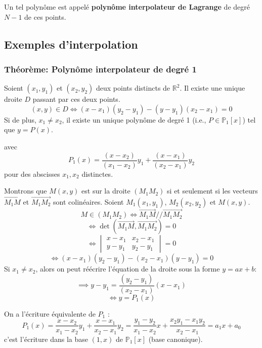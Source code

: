 \documentclass[oneside]{book}
\begin{document}
\begin{definition}
Un tel polynôme est appelé \textbf{polynôme interpolateur de Lagrange} de degré $N-1$ de ces points.
\end{definition}

\subsection{Exemples d'interpolation}

\subsubsection{Théorème: Polynôme interpolateur de degré 1}

\begin{theorem}
Soient $(x_1, y_1)$ et $(x_2, y_2)$ deux points distincts de $\mathbb{R}^2$.
Il existe une unique droite $D$ passant par ces deux points.
\[
(x, y) \in D \iff (x-x_1)(y_2-y_1) - (y-y_1)(x_2-x_1) = 0
\]
Si de plus, $x_1 \neq x_2$, il existe un unique polynôme de degré 1 (i.e., $P \in \mathbb{P}_1[x]$) tel que $y = P(x)$.

avec
\[
P_1(x) = \frac{(x-x_2)}{(x_1-x_2)} y_1 + \frac{(x-x_1)}{(x_2-x_1)} y_2
\]
pour des abscisses $x_1, x_2$ distinctes.
\end{theorem}

\begin{example}
Montrons que $M(x,y)$ est sur la droite $(M_1M_2)$ si et seulement si les vecteurs $\overrightarrow{M_1M}$ et $\overrightarrow{M_1M_2}$ sont colinéaires.
Soient $M_1(x_1, y_1)$, $M_2(x_2, y_2)$ et $M(x,y)$.
\[
M \in (M_1M_2) \Leftrightarrow \overrightarrow{M_1M} // \overrightarrow{M_1M_2}
\]
\[
\Leftrightarrow \det(\overrightarrow{M_1M}, \overrightarrow{M_1M_2}) = 0
\]
\[
\Leftrightarrow \begin{vmatrix} x-x_1 & x_2-x_1 \\ y-y_1 & y_2-y_1 \end{vmatrix} = 0
\]
\[
\Leftrightarrow (x-x_1)(y_2-y_1) - (x_2-x_1)(y-y_1) = 0
\]
Si $x_1 \neq x_2$, alors on peut réécrire l'équation de la droite sous la forme $y=ax+b$:
\[
\implies y-y_1 = \frac{(y_2-y_1)}{(x_2-x_1)} (x-x_1)
\]
\[
\Leftrightarrow y = P_1(x)
\]
\end{example}

\begin{remark}
On a l'écriture équivalente de $P_1$ :
\[
P_1(x) = \frac{x-x_2}{x_1-x_2} y_1 + \frac{x-x_1}{x_2-x_1} y_2 = \frac{y_1-y_2}{x_1-x_2} x + \frac{x_2y_1-x_1y_2}{x_2-x_1} = a_1 x + a_0
\]
c'est l'écriture dans la base $(1, x)$ de $\mathbb{P}_1[x]$ (base canonique).
\end{remark}
\end{document}
